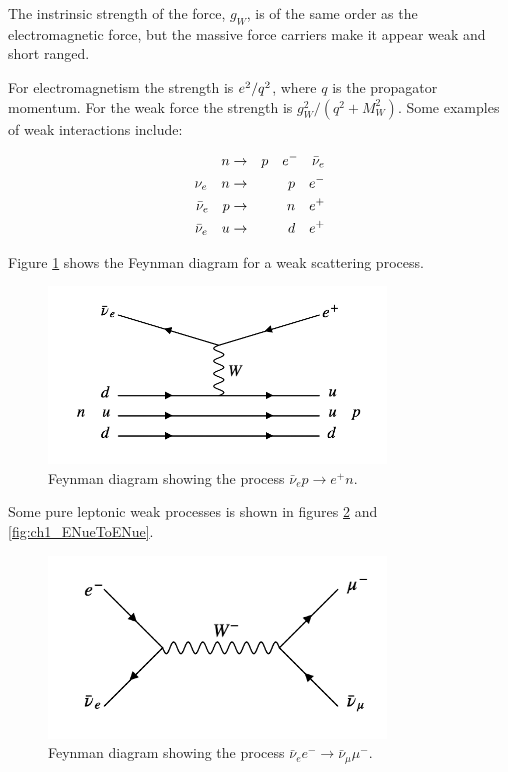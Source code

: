 The instrinsic strength of the force, $g_W$, is of the same order as the electromagnetic force, but the massive force carriers make it appear weak and short ranged.

For electromagnetism the strength is $e^2/q^2$, where $q$ is the propagator momentum.  For the weak force the strength is $g^2_W/(q^2 + M^2_W)$.  Some examples of weak interactions include:

\begin{eqnarray*}
  n                   & \to & p \quad e^- \quad \bar{\nu}_e \\
  \nu_e \quad n       & \to & p \quad e^- \\
  \bar{\nu}_e \quad p & \to & n \quad e^+ \\
  \bar{\nu}_e \quad u & \to & d \quad e^+
\end{eqnarray*}

Figure \ref{fig:ch1_NToPENu} shows the Feynman diagram for a weak scattering process.

\begin{figure}[!htb]
  \begin{center}
    \includegraphics[width=0.8\textwidth]{images/web_feynman/image_1.png}
    \caption[Feynman diagram of proton-antineutrino scattering]{Feynman diagram showing the process $\bar{\nu}_e p \to e^+ n$.}
    \label{fig:ch1_NToPENu}
  \end{center}
\end{figure}

Some pure leptonic weak processes is shown in figures \ref{fig:ch1_NueEToNumMu} and \ref{fig:ch1_ENueToENue}.

\begin{figure}[!htb]
  \begin{center}
    \includegraphics[width=0.8\textwidth]{images/web_feynman/image_2.png}
    \caption[Feynman diagram of lepton scattering]{Feynman diagram showing the process $\bar{\nu}_e e^- \to \bar{\nu}_\mu \mu^-$.}
    \label{fig:ch1_NueEToNumMu}
  \end{center}
\end{figure}

